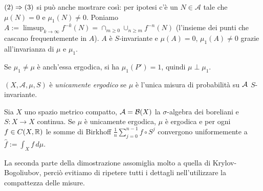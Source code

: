 \begin{oss}$(2)\Rightarrow (3)$ si può anche mostrare così: per ipotesi c'è un $N\in\mathcal{A}$ tale che $\mu(N)=0$ e $\mu_1(N)\neq 0$.
Poniamo $A:=\limsup_{k\to\infty}f^{-k}(N)=\cap_{m\ge 0}\cup_{n\ge m}f^{-n}(N)$ (l'insieme dei punti che
cascano frequentemente in $A$). $A$ è $S$-invariante e $\mu(A)=0$, $\mu_1(A)\neq 0$ grazie all'invarianza di $\mu$ e $\mu_1$.
\end{oss}

\begin{oss}Se $\mu_1\neq\mu$ è anch'essa ergodica, si ha $\mu_1(P')=1$, quindi $\mu\perp\mu_1$.
\end{oss}

\begin{defi}$(X,\mathcal{A},\mu,S)$ è \emph{unicamente ergodico} se $\mu$ è l'unica misura di probabilità su $\mathcal{A}$
$S$-invariante.
\end{defi}

\begin{teo}Sia $X$ uno spazio metrico compatto, $\mathcal{A}=\mathcal{B}(X)$ la $\sigma$-algebra dei boreliani
e $S:X\to X$ continua. Se $\mu$ è unicamente ergodica, $\mu$ è ergodica e per ogni $f\in C(X,\mathbb{R})$
le somme di Birkhoff $\frac{1}{n}\sum_{j=0}^{n-1}f\circ S^j$ convergono uniformemente a $\widehat{f}:=\int_X f\,d\mu$.
\end{teo}

La seconda parte della dimostrazione assomiglia molto a quella di Krylov-Bogoliubov,
perciò evitiamo di ripetere tutti i dettagli nell'utilizzare la compattezza delle misure.

